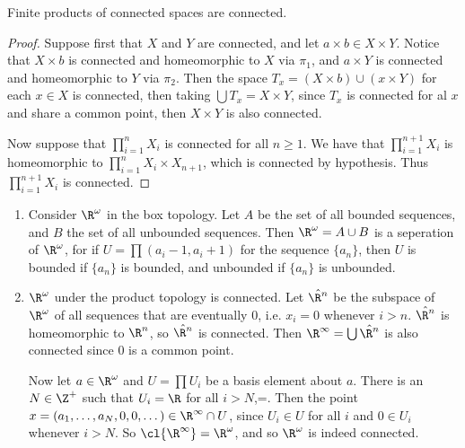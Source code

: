 \begin{theorem}\label{3.1.7}
    Finite products of connected spaces are connected.
\end{theorem}
\begin{proof}
    Suppose first that $X$ and  $Y$ are connected, and let  $a \times b \in X \times Y$. Notice that
     $X \times b$ is connected and homeomorphic to  $X$ via  $\pi_1$, and $a \times Y$ is connected
     and homeomorphic to  $Y$ via  $\pi_2$. Then the space $T_x=(X \times b) \cup (x \times Y)$ for
     each $x \in X$ is connected, then taking  $\bigcup{T_x}=X \times Y$, since $T_x$ is connected
     for al  $x$ and share a common point, then  $X \times Y$ is also connected.

     Now suppose that  $\prod_{i=1}^{n}{X_i}$ is connected for all $n \geq 1$. We have that
     $\prod_{i=1}^{n+1}{X_i}$ is homeomorphic to $\prod_{i=1}^{n}{X_i} \times X_{n+1}$, which is
     connected by hypothesis. Thus $\prod_{i=1}^{n+1}{X_i}$ is connected. 
\end{proof}

\begin{example}
    \begin{enumerate}[label=(\arabic*)]
        \item Consider $\R^{\omega}$ in the box topology. Let $A$ be the set of all bounded
            sequences, and  $B$ the set of all unbounded sequences. Then  $\R^{\omega}=A \cup B$ is
            a seperation of $\R^{\omega}$, for if $U=\prod{(a_i-1,a_i+1)}$ for the sequence
            $\{a_n\}$, then $U$ is bounded if  $\{a_n\}$ is bounded, and unbounded if $\{a_n\}$ is
            unbounded.

        \item $\R^{\omega}$ under the product topology is connected. Let $\hat{\R^n}$ be the
            subspace of $\R^{\omega}$ of all sequences that are eventually $0$, i.e.  $x_i=0$
            whenever  $i>n$.  $\hat{\R^n}$ is homeomorphic to $\R^n$, so  $\hat{\R^n}$ is connected.
            Then $\R^{\infty}=\bigcup{\hat{\R^n}}$ is also connected since $0$ is a common point.

            Now let  $a \in \R^{\omega}$ and $U=\prod{U_i}$ be a basis element about $a$. There is
            an  $N \in \Z^+$ such that  $U_i=\R$ for all  $i>N$,=. Then the point  $x=(a_1,\dots,
            a_N,0,0,\dots) \in \R^{\infty} \cap U$, since $U_i \in U$ for all  $i$ and  $0 \in U_i$
            whenever  $i>N$. So $\cl {\R^{\infty}}=\R^{\omega}$, and so $\R^{\omega}$ is indeed
            connected.
    \end{enumerate}		
\end{example} 
